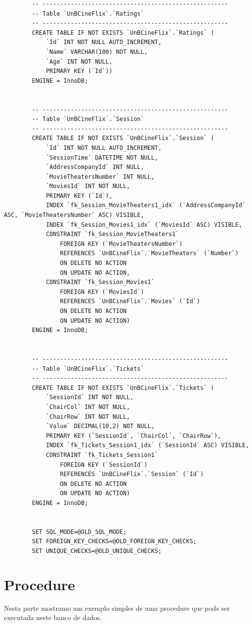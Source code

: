 \documentclass[a4paper,10pt]{article}
\begin{document}
\begin{lstlisting}
		-- -----------------------------------------------------
		-- Table `UnBCineFlix`.`Ratings`
		-- -----------------------------------------------------
		CREATE TABLE IF NOT EXISTS `UnBCineFlix`.`Ratings` (
			`Id` INT NOT NULL AUTO_INCREMENT,
			`Name` VARCHAR(100) NOT NULL,
			`Age` INT NOT NULL,
			PRIMARY KEY (`Id`))
		ENGINE = InnoDB;


		-- -----------------------------------------------------
		-- Table `UnBCineFlix`.`Session`
		-- -----------------------------------------------------
		CREATE TABLE IF NOT EXISTS `UnBCineFlix`.`Session` (
			`Id` INT NOT NULL AUTO_INCREMENT,
			`SessionTime` DATETIME NOT NULL,
			`AddressCompanyId` INT NULL,
			`MovieTheatersNumber` INT NULL,
			`MoviesId` INT NOT NULL,
			PRIMARY KEY (`Id`),
			INDEX `fk_Session_MovieTheaters1_idx` (`AddressCompanyId` ASC, `MovieTheatersNumber` ASC) VISIBLE,
			INDEX `fk_Session_Movies1_idx` (`MoviesId` ASC) VISIBLE,
			CONSTRAINT `fk_Session_MovieTheaters1`
				FOREIGN KEY (`MovieTheatersNumber`)
				REFERENCES `UnBCineFlix`.`MovieTheaters` (`Number`)
				ON DELETE NO ACTION
				ON UPDATE NO ACTION,
			CONSTRAINT `fk_Session_Movies1`
				FOREIGN KEY (`MoviesId`)
				REFERENCES `UnBCineFlix`.`Movies` (`Id`)
				ON DELETE NO ACTION
				ON UPDATE NO ACTION)
		ENGINE = InnoDB;


		-- -----------------------------------------------------
		-- Table `UnBCineFlix`.`Tickets`
		-- -----------------------------------------------------
		CREATE TABLE IF NOT EXISTS `UnBCineFlix`.`Tickets` (
			`SessionId` INT NOT NULL,
			`ChairCol` INT NOT NULL,
			`ChairRow` INT NOT NULL,
			`Value` DECIMAL(10,2) NOT NULL,
			PRIMARY KEY (`SessionId`, `ChairCol`, `ChairRow`),
			INDEX `fk_Tickets_Session1_idx` (`SessionId` ASC) VISIBLE,
			CONSTRAINT `fk_Tickets_Session1`
				FOREIGN KEY (`SessionId`)
				REFERENCES `UnBCineFlix`.`Session` (`Id`)
				ON DELETE NO ACTION
				ON UPDATE NO ACTION)
		ENGINE = InnoDB;


		SET SQL_MODE=@OLD_SQL_MODE;
		SET FOREIGN_KEY_CHECKS=@OLD_FOREIGN_KEY_CHECKS;
		SET UNIQUE_CHECKS=@OLD_UNIQUE_CHECKS;
\end{lstlisting}

\section{Procedure}

Nesta parte mostramo um exemplo simples de uma procedure que pode ser executada neste banco de dados.
\end{document}
